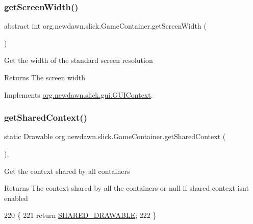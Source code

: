 \subsubsection{\texorpdfstring{get\+Screen\+Width()}{getScreenWidth()}}
{\footnotesize\ttfamily abstract int org.\+newdawn.\+slick.\+Game\+Container.\+get\+Screen\+Width (\begin{DoxyParamCaption}{ }\end{DoxyParamCaption})\hspace{0.3cm}{\ttfamily [abstract]}}

Get the width of the standard screen resolution

\begin{DoxyReturn}{Returns}
The screen width 
\end{DoxyReturn}


Implements \mbox{\hyperlink{interfaceorg_1_1newdawn_1_1slick_1_1gui_1_1_g_u_i_context_abbe4c9d529ed0c3dff177021f4839389}{org.\+newdawn.\+slick.\+gui.\+G\+U\+I\+Context}}.

\mbox{\label{classorg_1_1newdawn_1_1slick_1_1_game_container_ad4f9b798c9b8fa6d374cc2797447f4e9}} 
\subsubsection{\texorpdfstring{get\+Shared\+Context()}{getSharedContext()}}
{\footnotesize\ttfamily static Drawable org.\+newdawn.\+slick.\+Game\+Container.\+get\+Shared\+Context (\begin{DoxyParamCaption}{ }\end{DoxyParamCaption})\hspace{0.3cm}{\ttfamily [inline]}, {\ttfamily [static]}}

Get the context shared by all containers

\begin{DoxyReturn}{Returns}
The context shared by all the containers or null if shared context isn\textquotesingle{}t enabled 
\end{DoxyReturn}

\begin{DoxyCode}
220                                               \{
221         \textcolor{keywordflow}{return} \mbox{\hyperlink{classorg_1_1newdawn_1_1slick_1_1_game_container_ac1844f34fb7c738852219330998424a3}{SHARED\_DRAWABLE}};
222     \}
\end{DoxyCode}
\mbox{\label{classorg_1_1newdawn_1_1slick_1_1_game_container_a7c82c1b3a36e8c8fd3b2167042c2c63d}} 
